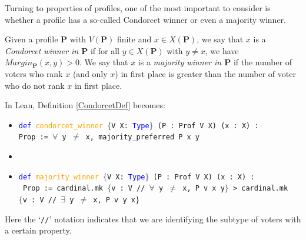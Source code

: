 \documentclass[runningheads]{llncs}
\begin{document}
Turning to properties of profiles, one of the most important to consider is whether a profile has a so-called Condorcet winner or even a majority winner.

\begin{definition}\label{CondorcetDef} \textnormal{Given a profile $\mathbf{P}$ with $V(\mathbf{P})$ finite and $x\in X(\mathbf{P})$, we say that $x$ is a \textit{Condorcet winner in $\mathbf{P}$} if for all $y\in X(\mathbf{P})$ with $y\neq x$, we have $Margin_\mathbf{P}(x,y)>0$. We say that $x$ is a \textit{majority winner in $\mathbf{P}$} if the number of voters who rank $x$ (and only $x$) in first place is greater than the number of voter who do not rank $x$ in first place.}
\end{definition}
In Lean, Definition \ref{CondorcetDef} becomes:

\begin{itemize}
\item[] \texttt{\textcolor{blue}{def} \textcolor{orange}{condorcet\_winner} $\{$V X: \textcolor{blue}{Type}$\}$ (P : Prof V X) (x : X) :} \\ \texttt{Prop := $\forall$ y $\neq$ x, majority\_preferred P x y}
\item[]
\item[] \texttt{\textcolor{blue}{def} \textcolor{orange}{majority\_winner} $\{$V X: \textcolor{blue}{Type}$\}$ (P : Prof V X) (x : X) :} \\
\texttt{ Prop := cardinal.mk $\{$v : V // $\forall$ y $\neq$ x, P v x y$\}$ > cardinal.mk} \\ \texttt{$\{$v : V // $\exists$ y $\neq$ x, P v y x$\}$}
\end{itemize}
Here the `\texttt{//}' notation indicates that we are identifying the subtype of voters with a certain property. 
\end{document}
